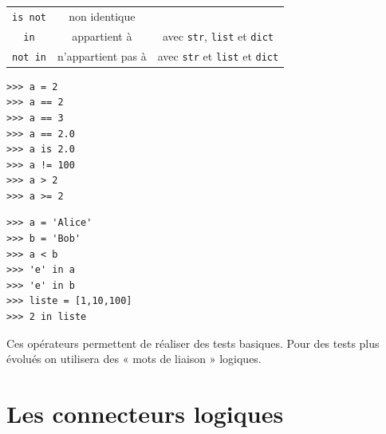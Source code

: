 {\begin{tabular}{CCC}
	\texttt{is not} & non identique         &                                                                                                                         \\

	\texttt{in}     & appartient à          & avec \texttt{str}, \texttt{list} et \texttt{dict}                                   \\

	\texttt{not in} & n'appartient pas à    & avec \texttt{str} et \texttt{list} et \texttt{dict}                                 \\
\end{tabular}
}\normalsize

\begin{pys}
	\begin{verbatim}
>>> a = 2
>>> a == 2
>>> a == 3
>>> a == 2.0
>>> a is 2.0
>>> a != 100
>>> a > 2
>>> a >= 2
    \end{verbatim}
\end{pys}

\begin{pys}
	\begin{verbatim}
>>> a = 'Alice'
>>> b = 'Bob'
>>> a < b
>>> 'e' in a
>>> 'e' in b
>>> liste = [1,10,100]
>>> 2 in liste
    \end{verbatim}
\end{pys}

Ces opérateurs permettent de réaliser des tests basiques. Pour des tests plus évolués on utilisera des « mots de liaison »  logiques.

\section{Les connecteurs logiques}

